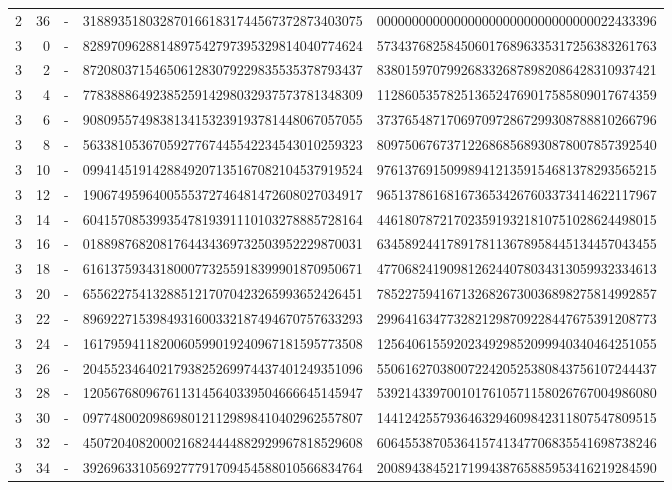 \begin{longtable}{rrrll}
2 & 36 & - & 3188935180328701661831744567372873403075 & 0000000000000000000000000000000022433396 \\
3 & 0 & - & 8289709628814897542797395329814040774624 & 5734376825845060176896335317256383261763 \\
3 & 2 & - & 8720803715465061283079229835535378793437 & 8380159707992683326878982086428310937421 \\
3 & 4 & - & 7783888649238525914298032937573781348309 & 1128605357825136524769017585809017674359 \\
3 & 6 & - & 9080955749838134153239193781448067057055 & 3737654871706970972867299308788810266796 \\
3 & 8 & - & 5633810536705927767445542234543010259323 & 8097506767371226868568930878007857392540 \\
3 & 10 & - & 0994145191428849207135167082104537919524 & 9761376915099894121359154681378293565215 \\
3 & 12 & - & 1906749596400555372746481472608027034917 & 9651378616816736534267603373414622117967 \\
3 & 14 & - & 6041570853993547819391110103278885728164 & 4461807872170235919321810751028624498015 \\
3 & 16 & - & 0188987682081764434369732503952229870031 & 6345892441789178113678958445134457043455 \\
3 & 18 & - & 6161375934318000773255918399901870950671 & 4770682419098126244078034313059932334613 \\
3 & 20 & - & 6556227541328851217070423265993652426451 & 7852275941671326826730036898275814992857 \\
3 & 22 & - & 8969227153984931600332187494670757633293 & 2996416347732821298709228447675391208773 \\
3 & 24 & - & 1617959411820060599019240967181595773508 & 1256406155920234929852099940340464251055 \\
3 & 26 & - & 2045523464021793825269974437401249351096 & 5506162703800722420525380843756107244437 \\
3 & 28 & - & 1205676809676113145640339504666645145947 & 5392143397001017610571158026767004986080 \\
3 & 30 & - & 0977480020986980121129898410402962557807 & 1441242557936463294609842311807547809515 \\
3 & 32 & - & 4507204082000216824444882929967818529608 & 6064553870536415741347706835541698738246 \\
3 & 34 & - & 3926963310569277791709454588010566834764 & 2008943845217199438765885953416219284590 \\

\end{longtable}
